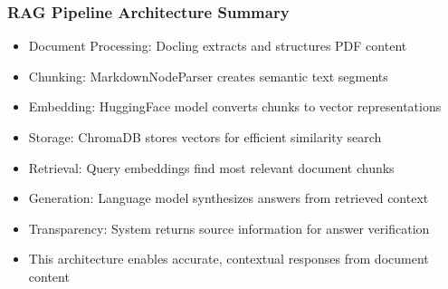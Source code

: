 \begin{frame}[fragile]\frametitle{RAG Pipeline Architecture Summary}
      \begin{itemize}
          \item Document Processing: Docling extracts and structures PDF content
          \item Chunking: MarkdownNodeParser creates semantic text segments
          \item Embedding: HuggingFace model converts chunks to vector representations
          \item Storage: ChromaDB stores vectors for efficient similarity search
          \item Retrieval: Query embeddings find most relevant document chunks
          \item Generation: Language model synthesizes answers from retrieved context
          \item Transparency: System returns source information for answer verification
          \item This architecture enables accurate, contextual responses from document content
      \end{itemize}
\end{frame}